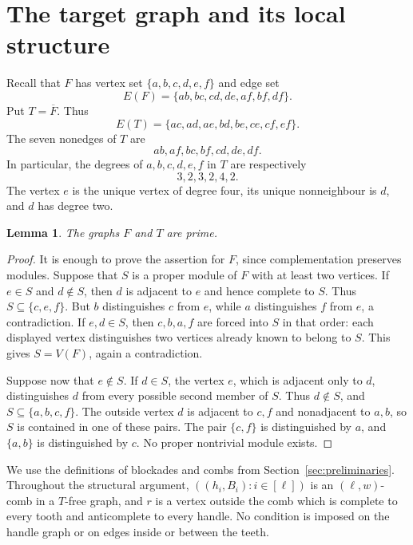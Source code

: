 \documentclass[11pt]{article}
\numberwithin{equation}{section}
\theoremstyle{plain}
\newtheorem{lemma}[theorem]{Lemma}
\theoremstyle{definition}
\begin{document}
\section{The target graph and its local structure}
\label{sec:target-local}

Recall that $F$ has vertex set $\{a,b,c,d,e,f\}$ and edge set
\[
 E(F)=\{ab,bc,cd,de,af,bf,df\}.
\]
Put $T=\overline F$.  Thus
\begin{equation}
 E(T)=\{ac,ad,ae,bd,be,ce,cf,ef\}.
 \label{eq:T-edge-set}
\end{equation}
The seven nonedges of $T$ are
\begin{equation}
 ab,af,bc,bf,cd,de,df.
 \label{eq:T-nonedge-set}
\end{equation}
In particular, the degrees of $a,b,c,d,e,f$ in $T$ are respectively
\[
                         3,2,3,2,4,2.
\]
The vertex $e$ is the unique vertex of degree four, its unique nonneighbour
is $d$, and $d$ has degree two.

\begin{lemma}
\label{lem:F-prime}
The graphs $F$ and $T$ are prime.
\end{lemma}

\begin{proof}
It is enough to prove the assertion for $F$, since complementation
preserves modules.  Suppose that $S$ is a proper module of $F$ with at
least two vertices.  If $e\in S$ and $d\notin S$, then $d$ is adjacent
to $e$ and hence complete to $S$.  Thus $S\subseteq\{c,e,f\}$.  But $b$
distinguishes $c$ from $e$, while $a$ distinguishes $f$ from $e$, a
contradiction.  If $e,d\in S$, then $c,b,a,f$ are forced into $S$ in
that order: each displayed vertex distinguishes two vertices already
known to belong to $S$.  This gives $S=V(F)$, again a contradiction.

Suppose now that $e\notin S$.  If $d\in S$, the vertex $e$, which is
adjacent only to $d$, distinguishes $d$ from every possible second
member of $S$.
Thus $d\notin S$, and $S\subseteq\{a,b,c,f\}$.  The outside vertex $d$
is adjacent to $c,f$ and nonadjacent to $a,b$, so $S$ is contained in one of
these pairs.  The pair $\{c,f\}$ is distinguished by $a$, and
$\{a,b\}$ is distinguished by $c$.  No proper nontrivial module
exists.
\end{proof}

We use the definitions of blockades and combs from
Section~\ref{sec:preliminaries}.  Throughout the structural argument,
$((h_i,B_i):i\in[\ell])$ is an $(\ell,w)$-comb in a $T$-free graph,
and $r$ is a vertex outside the comb which is complete to every tooth
and anticomplete to every handle.  No condition is imposed on the
handle graph or on edges inside or between the teeth.
\end{document}
